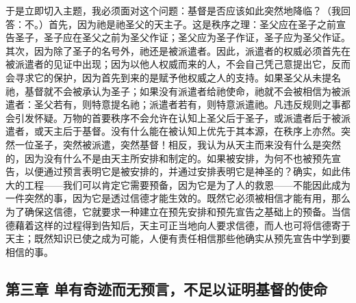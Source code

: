 于是立即切入主题，我必须面对这个问题：基督是否应该如此突然地降临？（我回答：不。）首先，因为祂是祂圣父的天主子。这是秩序之理：圣父应在圣子之前宣告圣子，圣子应在圣父之前为圣父作证；圣父应为圣子作证，圣子应为圣父作证。其次，因为除了圣子的名号外，祂还是被派遣者。因此，派遣者的权威必须首先在被派遣者的见证中出现；因为以他人权威而来的人，不会自己凭己意提出它，反而会寻求它的保护，因为首先到来的是赋予他权威之人的支持。如果圣父从未提名祂，基督就不会被承认为圣子；如果没有派遣者给祂使命，祂就不会被相信为被派遣者：圣父若有，则特意提名祂；派遣者若有，则特意派遣祂。凡违反规则之事都会引发怀疑。万物的首要秩序不会允许在认知上圣父后于圣子，或派遣者后于被派遣者，或天主后于基督。没有什么能在被认知上优先于其本源，在秩序上亦然。突然一位圣子，突然被派遣，突然基督！相反，我认为从天主而来没有什么是突然的，因为没有什么不是由天主所安排和制定的。如果被安排，为何不也被预先宣告，以便通过预言表明它是被安排的，并通过安排表明它是神圣的？确实，如此伟大的工程——我们可以肯定它需要预备，因为它是为了人的救恩——不能因此成为一件突然的事，因为它是透过信德才能生效的。既然它必须被相信才能有用，那么为了确保这信德，它就要求一种建立在预先安排和预先宣告之基础上的预备。当信德藉着这样的过程得到告知后，天主可正当地向人要求信德，而人也可将信德寄于天主；既然知识已使之成为可能，人便有责任相信那些他确实从预先宣告中学到要相信的事。\par


\subsection{第三章 单有奇迹而无预言，不足以证明基督的使命}


